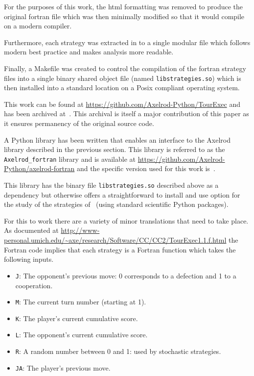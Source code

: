 \documentclass{article}
\begin{document}
For the purposes of this work, the html formatting was removed to produce the original
fortran file which was then minimally modified so that it would compile on a modern
compiler.

Furthermore, each strategy was extracted in to a single modular file which
follows modern best practice and makes analysis more readable.

Finally, a Makefile was created to control the compilation of the fortran
strategy files into a single binary shared object file (named
\texttt{libstrategies.so}) which is then installed into a standard location on
a Posix compliant operating system.

This work can be found
at \url{https://github.com/Axelrod-Python/TourExec} and has been archived
at~\cite{TourExec}. This archival is itself a major contribution of this paper
as it ensures permanency of the original source code.

A Python library has been written that enables an interface to
the Axelrod library described in the previous section. This library is referred
to as the \texttt{Axelrod\_fortran} library and is available
at \url{https://github.com/Axelrod-Python/axelrod-fortran} and the specific
version used for this work is~\cite{Axelrod_fortran}.

This library has the binary file \texttt{libstrategies.so} described above as
a dependency but otherwise offers a straightforward to install and use option
for the study of the strategies of~\cite{Axelrod1980b} (using standard
scientific Python packages).

For this to work there are a variety of minor translations that need to take
place. As documented at
\url{http://www-personal.umich.edu/~axe/research/Software/CC/CC2/TourExec1.1.f.html}
the Fortran code implies that each strategy is a Fortran function which takes
the following inputs.

\begin{itemize}
    \item  \texttt{J}: The opponent's previous move: 0 corresponds to a
        defection and 1 to a cooperation.
    \item \texttt{M}: The current turn number (starting at 1).
    \item \texttt{K}: The player's current cumulative score.
    \item \texttt{L}: The opponent's current cumulative score.
    \item \texttt{R}: A random number between 0 and 1: used by stochastic
        strategies.
    \item \texttt{JA}: The player's previous move.
\end{itemize}
\end{document}

